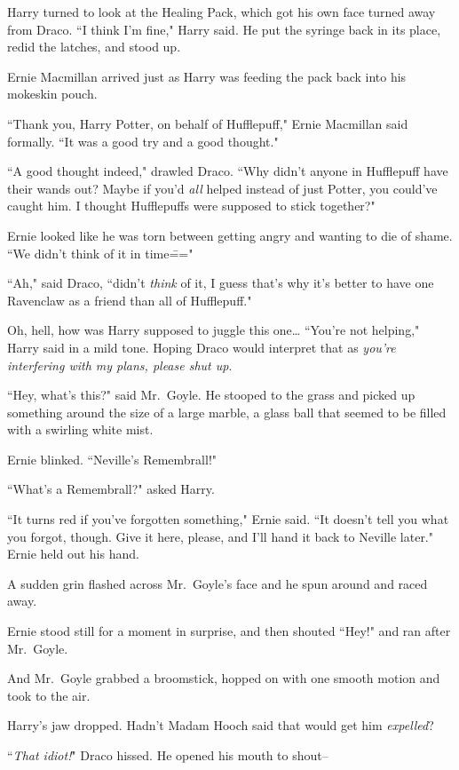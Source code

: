 Harry turned to look at the Healing Pack, which got his own face turned away from Draco. ``I think I'm fine," Harry said. He put the syringe back in its place, redid the latches, and stood up.

Ernie Macmillan arrived just as Harry was feeding the pack back into his mokeskin pouch.

``Thank you, Harry Potter, on behalf of Hufflepuff," Ernie Macmillan said formally. ``It was a good try and a good thought."

``A good thought indeed," drawled Draco. ``Why didn't anyone in Hufflepuff have their wands out? Maybe if you'd \emph{all} helped instead of just Potter, you could've caught him. I thought Hufflepuffs were supposed to stick together?"

Ernie looked like he was torn between getting angry and wanting to die of shame. ``We didn't think of it in time\==="

``Ah," said Draco, ``didn't \emph{think} of it, I guess that's why it's better to have one Ravenclaw as a friend than all of Hufflepuff."

Oh, hell, how was Harry supposed to juggle this one{\ldots} ``You're not helping," Harry said in a mild tone. Hoping Draco would interpret that as \emph{you're interfering with my plans, please shut up}.

``Hey, what's this?" said Mr.~Goyle. He stooped to the grass and picked up something around the size of a large marble, a glass ball that seemed to be filled with a swirling white mist.

Ernie blinked. ``Neville's Remembrall!"

``What's a Remembrall?" asked Harry.

``It turns red if you've forgotten something," Ernie said. ``It doesn't tell you what you forgot, though. Give it here, please, and I'll hand it back to Neville later." Ernie held out his hand.

A sudden grin flashed across Mr.~Goyle's face and he spun around and raced away.

Ernie stood still for a moment in surprise, and then shouted ``Hey!" and ran after Mr.~Goyle.

And Mr.~Goyle grabbed a broomstick, hopped on with one smooth motion and took to the air.

Harry's jaw dropped. Hadn't Madam Hooch said that would get him \emph{expelled}?

``\emph{That idiot!}" Draco hissed. He opened his mouth to shout\---

